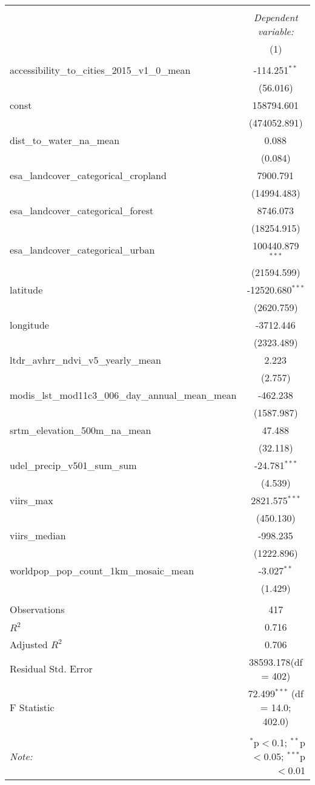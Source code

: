 \begin{table}[!htbp] \centering
\begin{tabular}{@{\extracolsep{5pt}}lc}
\\[-1.8ex]\hline
\hline \\[-1.8ex]
& \multicolumn{1}{c}{\textit{Dependent variable:}} \
\cr \cline{1-2}
\\[-1.8ex] & (1) \\
\hline \\[-1.8ex]
 accessibility_to_cities_2015_v1_0_mean & -114.251$^{**}$ \\
  & (56.016) \\
 const & 158794.601$^{}$ \\
  & (474052.891) \\
 dist_to_water_na_mean & 0.088$^{}$ \\
  & (0.084) \\
 esa_landcover_categorical_cropland & 7900.791$^{}$ \\
  & (14994.483) \\
 esa_landcover_categorical_forest & 8746.073$^{}$ \\
  & (18254.915) \\
 esa_landcover_categorical_urban & 100440.879$^{***}$ \\
  & (21594.599) \\
 latitude & -12520.680$^{***}$ \\
  & (2620.759) \\
 longitude & -3712.446$^{}$ \\
  & (2323.489) \\
 ltdr_avhrr_ndvi_v5_yearly_mean & 2.223$^{}$ \\
  & (2.757) \\
 modis_lst_mod11c3_006_day_annual_mean_mean & -462.238$^{}$ \\
  & (1587.987) \\
 srtm_elevation_500m_na_mean & 47.488$^{}$ \\
  & (32.118) \\
 udel_precip_v501_sum_sum & -24.781$^{***}$ \\
  & (4.539) \\
 viirs_max & 2821.575$^{***}$ \\
  & (450.130) \\
 viirs_median & -998.235$^{}$ \\
  & (1222.896) \\
 worldpop_pop_count_1km_mosaic_mean & -3.027$^{**}$ \\
  & (1.429) \\
\hline \\[-1.8ex]
 Observations & 417 \\
 $R^2$ & 0.716 \\
 Adjusted $R^2$ & 0.706 \\
 Residual Std. Error & 38593.178(df = 402)  \\
 F Statistic & 72.499$^{***}$ (df = 14.0; 402.0) \\
\hline
\hline \\[-1.8ex]
\textit{Note:} & \multicolumn{1}{r}{$^{*}$p$<$0.1; $^{**}$p$<$0.05; $^{***}$p$<$0.01} \\
\end{tabular}
\end{table}